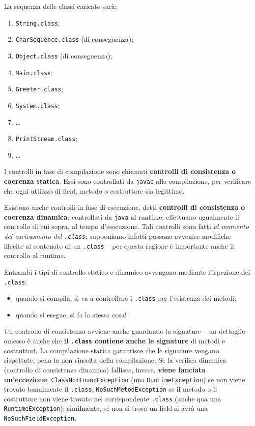 \documentclass[\fontsizeclass,twocolumn]{\classname}
\theoremstyle{definition}
\theoremstyle{definition}
\begin{document}
La sequenza delle classi caricate sarà:
\begin{enumerate}
    \item \texttt{String.class};
    \item \texttt{CharSequence.class} (di conseguenza);
    \item \texttt{Object.class} (di conseguenza);
    \item \texttt{Main.class};
    \item \texttt{Greeter.class};
    \item \texttt{System.class};
    \item \dots
    \item \texttt{PrintStream.class};
    \item \dots
\end{enumerate}

I controlli in fase di compilazione sono chiamati \textbf{controlli di
consistenza o coerenza statica}. Essi sono controllati da \texttt{javac} alla
compilazione, per verificare che ogni utilizzo di field, metodo o costruttore
sia legittimo.

Esistono anche controlli in fase di esecuzione, detti \textbf{controlli di
consistenza o coerenza dinamica}: controllati da \texttt{java} al runtime,
effettuano ugualmente il controllo di cui sopra, al tempo d'esecuzione. Tali
controlli sono fatti \emph{al momento del caricamento del \texttt{.class}};
supponiamo infatti possano avvenire modifiche illecite al contenuto di un
\texttt{.class} -- per questa ragione è importante anche il controllo al
runtime.

Entrambi i tipi di controllo statico e dinamico avvengono mediante l'ispezione
dei \texttt{.class}:
\begin{itemize}
    \item quando si compila, si va a controllare i \texttt{.class} per
        l'esistenza dei metodi;
    \item quando si esegue, si fa la stessa cosa!
\end{itemize}

Un controllo di consistenza avviene anche guardando la signature -- un
dettaglio omesso è anche che \textbf{il \texttt{.class} contiene anche le
signature} di metodi e costruttori. La compilazione statica garantisce che le
signature vengano rispettate, pena la non riuscita della compilazione. Se la
verifica dinamica (controllo di consistenza dinamica) fallisce, invece,
\textbf{viene lanciata un'eccezione}; \texttt{Class\-Not\-Found\-Exception} (una
\texttt{Runtime\-Exception}) se non viene trovato banalmente il \texttt{.class},
\texttt{No\-Such\-Metod\-Exception} se il metodo o il costruttore non viene trovato
nel corrispondente \texttt{.class} (anche qua una \texttt{Runtime\-Exception});
similmente, se non si trova un field si avrà una \texttt{No\-Such\-Field\-Exception}.
\end{document}
